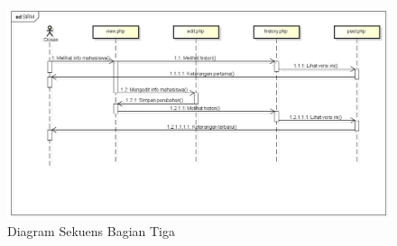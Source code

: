 \begin{figure}[H]
\centering
\includegraphics[scale=0.4]{Gambar/sekuensview.png}
\caption[Diagram Sekuens Bagian Tiga]{Diagram Sekuens Bagian Tiga} 
\label{fig:ds3}
\end{figure}